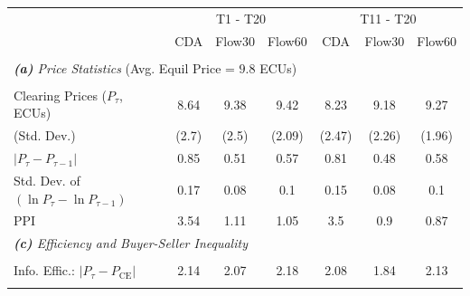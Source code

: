 \documentclass[12pt]{article}
\begin{document}
\begin{singlespace}
\begin{table}[H]
{\begin{threeparttable}
\begin{tabular}{lcccccc}
    ~ & \multicolumn{3}{c}{T1 - T20} & \multicolumn{3}{c}{T11 - T20} \\
                                    & CDA       & Flow30      & Flow60      & CDA       & Flow30     & Flow60     \\
    \midrule
     \\[-1.8ex]
    \multicolumn{7}{l}{\textit{\textbf{(a)} Price Statistics} (Avg. Equil Price = $9.8$ ECUs)} \\
     \\[-1.8ex]
     Clearing Prices ($P_{\tau}$, ECUs)              & 8.64     & 9.38     & 9.42     & 8.23     & 9.18     & 9.27           \\
     \hspace{3mm}(Std. Dev.)                    & (2.7)    & (2.5)    & (2.09)   & (2.47)   & (2.26)   & (1.96)         \\
     $ \lvert  P_{\tau}-P_{\tau - 1} \rvert $         & 0.85     & 0.51     & 0.57     & 0.81     & 0.48     & 0.58          \\
     Std. Dev. of $(\ln P_{\tau} - \ln P_{\tau - 1})$ & 0.17     & 0.08     & 0.1      & 0.15     & 0.08     & 0.1            \\
     PPI       & 3.54     & 1.11     & 1.05     & 3.5      & 0.9      & 0.87            \\
    \multicolumn{7}{l}{\textit{\textbf{(c)} Efficiency and Buyer-Seller Inequality}} \\
     \\ [-1.8ex]
     Info. Effic.: $\lvert P_\tau - P_{\text{CE}} \rvert $        & 2.14     & 2.07     & 2.18     & 2.08     & 1.84     & 2.13          \\
     \\[-1.8ex]
    \bottomrule
    \end{tabular}
    \end{threeparttable}}
\end{table}


\end{singlespace}
\end{document}

